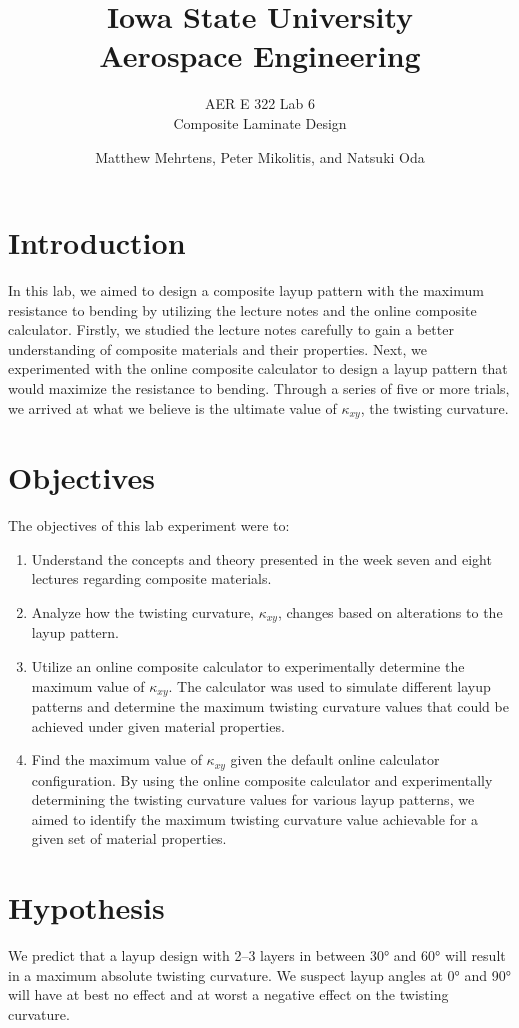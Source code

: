 \documentclass[12 pt]{article}
\title{\textbf{Iowa State University
\\{\Large Aerospace Engineering}}}
\subtitle{AER E 322 Lab 6\\
		  Composite Laminate Design}
\author{Matthew Mehrtens, Peter Mikolitis, and Natsuki Oda}
\begin{document}
\maketitle
\tableofcontents
\section{Introduction} \label{introduction}
In this lab, we aimed to design a composite layup pattern with the maximum resistance to bending by utilizing the lecture notes and the online composite calculator. Firstly, we studied the lecture notes carefully to gain a better understanding of composite materials and their properties. Next, we experimented with the online composite calculator to design a layup pattern that would maximize the resistance to bending. Through a series of five or more trials, we arrived at what we believe is the ultimate value of $\kappa_{xy}$, the twisting curvature.

\section{Objectives} \label{objectives}
The objectives of this lab experiment were to:

\begin{enumerate}
	\item Understand the concepts and theory presented in the week seven and eight lectures regarding composite materials.
	\item Analyze how the twisting curvature, $\kappa_{xy}$, changes based on alterations to the layup pattern.
	\item Utilize an online composite calculator to experimentally determine the maximum value of $\kappa_{xy}$. The calculator was used to simulate different layup patterns and determine the maximum twisting curvature values that could be achieved under given material properties.
	\item Find the maximum value of $\kappa_{xy}$ given the default online calculator configuration. By using the online composite calculator and experimentally determining the twisting curvature values for various layup patterns, we aimed to identify the maximum twisting curvature value achievable for a given set of material properties.
\end{enumerate}

\section{Hypothesis} \label{hypothesis}
We predict that a layup design with \numrange{2}{3} layers in between \ang{30} and \ang{60} will result in a maximum absolute twisting curvature. We suspect layup angles at \ang{0} and \ang{90} will have at best no effect and at worst a negative effect on the twisting curvature.
\end{document}
